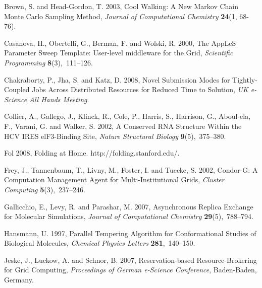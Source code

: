 \documentclass{rspublic}
\begin{document}


\begin{thebibliography}{xx}

Brown, S. and Head-Gordon, T. 2003, {Cool Walking: A New Markov Chain Monte
  Carlo Sampling Method}, {\em Journal of Computational Chemistry} {\bf 24}(1,
  68-76).

Casanova, H., Obertelli, G., Berman, F. and Wolski, R. 2000, {The AppLeS
  Parameter Sweep Template: User-level middleware for the Grid}, {\em
  Scientific Programming} {\bf 8}(3),~111--126.

Chakraborty, P., Jha, S. and Katz, D. 2008, {Novel Submission Modes for
  Tightly-Coupled Jobs Across Distributed Resources for Reduced Time to
  Solution}, {\em UK e-Science All Hands Meeting}.

Collier, A., Gallego, J., Klinck, R., Cole, P., Harris, S., Harrison, G.,
  Aboul-ela, F., Varani, G. and Walker, S. 2002, {A Conserved RNA Structure
  Within the HCV IRES elF3-Binding Site}, {\em Nature Structural Biology} {\bf
  9}(5),~375--380.

Fol 2008, {Folding at Home}.
\newblock http://folding.stanford.edu/.

Frey, J., Tannenbaum, T., Livny, M., Foster, I. and Tuecke, S. 2002, {Condor-G:
  A Computation Management Agent for Multi-Institutional Grids}, {\em Cluster
  Computing} {\bf 5}(3),~237--246.

Gallicchio, E., Levy, R. and Parashar, M. 2007, {Asynchronous Replica Exchange
  for Molecular Simulations}, {\em Journal of Computational Chemistry} {\bf
  29}(5),~788--794.

Hansmann, U. 1997, {Parallel Tempering Algorithm for Conformational Studies of
  Biological Molecules}, {\em Chemical Physics Letters} {\bf 281},~140--150.

Jeske, J., Luckow, A. and Schnor, B. 2007, {Reservation-based
  Resource-Brokering for Grid Computing}, {\em Proceedings of German e-Science
  Conference}, Baden-Baden, Germany.


\end{thebibliography}
\end{document}
